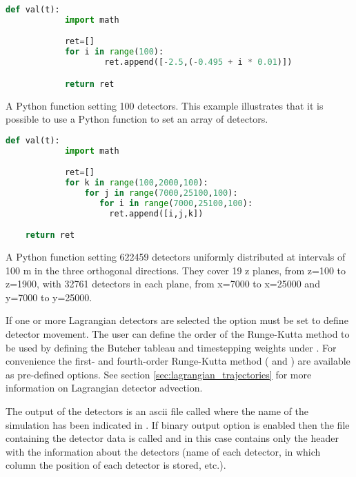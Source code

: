 \begin{example}
  \begin{lstlisting}[language=Python]
def val(t):
            import math

            ret=[]
            for i in range(100):
                    ret.append([-2.5,(-0.495 + i * 0.01)])

            return ret
  \end{lstlisting}
  \caption{A Python function setting 100 detectors. This
  example illustrates that it is possible to use a Python function to set an array of detectors.}
  \label{examp:python_function_detectors}
\end{example}

\begin{example}
  \begin{lstlisting}[language=Python]
def val(t):
            import math

            ret=[]
            for k in range(100,2000,100):
                for j in range(7000,25100,100):
	               for i in range(7000,25100,100):
		             ret.append([i,j,k])

	return ret
  \end{lstlisting}
  \caption{A Python function setting 622459 detectors uniformly distributed
    at intervals of 100 m in the three orthogonal directions. They cover 19 z planes, from z=100 to z=1900, with 32761 detectors in each plane, from
    x=7000 to x=25000 and y=7000 to y=25000.}
  \label{examp:python_function_detectors_1}
\end{example}

If one or more Lagrangian detectors are selected the option  must be set to define detector movement. 
The user can define the order of the Runge-Kutta method to be used by defining the Butcher tableau and timestepping weights under . 
For convenience the first- and fourth-order Runge-Kutta method ( and ) are available as pre-defined options. 
See section \ref{sec:lagrangian_trajectories} for more information on Lagrangian detector advection.

The output of the detectors is an ascii file called
 where the name of the simulation has
been indicated in . If binary output
  option is enabled then the file containing the detector data is called
 and in this case  contains only the header with the
information about the detectors (name of each detector, in which column the
position of each detector is stored, etc.).

